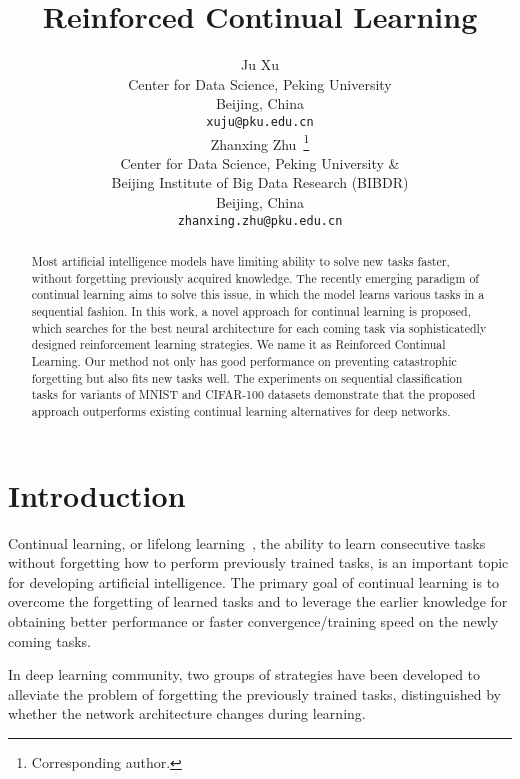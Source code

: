 \documentclass{article}
\title{Reinforced Continual Learning}
\author{
  Ju Xu  \\
  Center for Data Science, Peking University\\
  Beijing, China \\
  \texttt{xuju@pku.edu.cn} \\
  \And
   Zhanxing Zhu~\thanks{Corresponding author.}\\
   Center for Data Science, Peking University \& \\
   Beijing Institute of Big Data Research (BIBDR) \\
  Beijing, China \\
  \texttt{zhanxing.zhu@pku.edu.cn} \\
}
\begin{document}

\maketitle
\renewcommand\arraystretch{2}

\begin{abstract}
  Most artificial intelligence models   have  limiting ability to solve new tasks
  faster, without forgetting previously acquired knowledge. The recently emerging paradigm of continual learning aims to solve this issue, in which the model
  learns various tasks in a sequential fashion.
  In this work, a novel approach for continual learning is proposed,  which  searches for the best neural architecture for each coming task via sophisticatedly designed reinforcement learning strategies.  We name it as Reinforced Continual Learning. Our method not only has good performance on preventing catastrophic forgetting but also fits new tasks well.
  The experiments on sequential classification tasks for variants of MNIST and CIFAR-100 datasets demonstrate that the proposed approach outperforms existing continual learning alternatives for deep networks.
\end{abstract}

\section{Introduction}

Continual learning, or lifelong learning~\cite{thrun1}, the ability to learn
consecutive tasks without forgetting how to perform previously
trained tasks, is
an important topic for developing artificial intelligence. The primary goal of continual learning is to overcome the forgetting of learned tasks and to leverage  the earlier knowledge for obtaining better performance or faster convergence/training speed on the newly coming tasks.


In  deep learning community, two groups of strategies have been developed to alleviate the problem of  forgetting the previously trained tasks, distinguished by whether the network architecture changes during learning.
\end{document}
